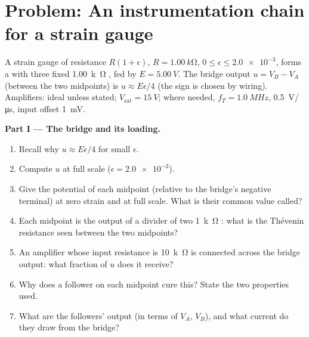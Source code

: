 \section{Problem: An instrumentation chain for a strain gauge}

\begin{problem}
\label{pb:b1:operational-amplifier:1}
A strain gauge of resistance $R(1 + \epsilon)$, $R = \qty{1.00}{k\ohm}$,
$0 \leq \epsilon \leq \num{2.0e-3}$, forms a  with
three fixed \qty{1.00}{k\ohm} , fed by $E = \qty{5.00}{V}$.
The bridge output $u = V_B - V_A$ (between the two midpoints) is
$u \approx E\epsilon/4$ (the sign is chosen by wiring). Amplifiers:
ideal unless stated; $V_{\mathrm{sat}} = \qty{15}{V}$; where needed,
$f_T = \qty{1.0}{MHz}$,  \qty{0.5}{V/\micro s}, input offset
\qty{1}{mV}.

\medskip
\noindent\textbf{Part I --- The bridge and its loading.}
\begin{enumerate}
  \item Recall why $u \approx E\epsilon/4$ for small $\epsilon$.
  \item Compute $u$ at full scale ($\epsilon = \num{2.0e-3}$).
  \item Give the potential of each midpoint (relative to the bridge's
        negative terminal) at zero strain and at full scale. What is
        their common value called?
  \item Each midpoint is the output of a divider of two \qty{1}{k\ohm}
        : what is the Thévenin resistance seen between the
        two midpoints?
  \item An amplifier whose input resistance is \qty{10}{k\ohm} is
        connected across the bridge output: what fraction of $u$ does it
        receive?
  \item Why does a follower on each midpoint cure this? State the two
        properties used.
  \item What are the followers' output  (in terms of $V_A$,
        $V_B$), and what current do they draw from the bridge?
\end{enumerate}


\end{problem}
